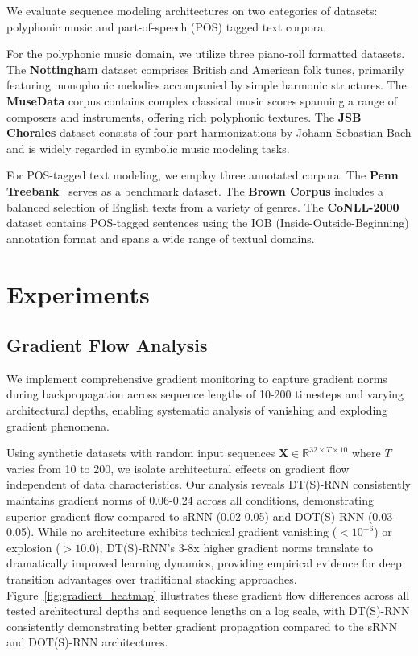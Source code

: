 \documentclass{article}
\begin{document}
We evaluate sequence modeling architectures on two categories of datasets: polyphonic music and part-of-speech (POS) tagged text corpora.

For the polyphonic music domain, we utilize three piano-roll formatted datasets. The \textbf{Nottingham}\cite{boulanger2012modeling} dataset comprises British and American folk tunes, primarily featuring monophonic melodies accompanied by simple harmonic structures. The \textbf{MuseData}\cite{museData} corpus contains complex classical music scores spanning a range of composers and instruments, offering rich polyphonic textures. The \textbf{JSB Chorales}\cite{boulanger2012modeling} dataset consists of four-part harmonizations by Johann Sebastian Bach and is widely regarded in symbolic music modeling tasks.

For POS-tagged text modeling, we employ three annotated corpora. The \textbf{Penn Treebank}~\cite{marcus1993building} serves as a benchmark dataset. The \textbf{Brown Corpus} includes a balanced selection of English texts from a variety of genres. The \textbf{CoNLL-2000} dataset contains POS-tagged sentences using the IOB (Inside-Outside-Beginning) annotation format and spans a wide range of textual domains.


\section{Experiments}

\subsection{Gradient Flow Analysis}

We implement comprehensive gradient monitoring to capture gradient norms during backpropagation across sequence lengths of 10-200 timesteps and varying architectural depths, enabling systematic analysis of vanishing and exploding gradient phenomena.

Using synthetic datasets with random input sequences $\mathbf{X} \in \mathbb{R}^{32 \times T \times 10}$ where $T$ varies from 10 to 200, we isolate architectural effects on gradient flow independent of data characteristics. Our analysis reveals DT(S)-RNN consistently maintains gradient norms of 0.06-0.24 across all conditions, demonstrating superior gradient flow compared to sRNN (0.02-0.05) and DOT(S)-RNN (0.03-0.05). While no architecture exhibits technical gradient vanishing ($< 10^{-6}$) or explosion ($> 10.0$), DT(S)-RNN's 3-8x higher gradient norms translate to dramatically improved learning dynamics, providing empirical evidence for deep transition advantages over traditional stacking approaches. Figure~\ref{fig:gradient_heatmap} illustrates these gradient flow differences across all tested architectural depths and sequence lengths on a log scale, with DT(S)-RNN consistently demonstrating better gradient propagation compared to the sRNN and DOT(S)-RNN architectures.
\end{document}
